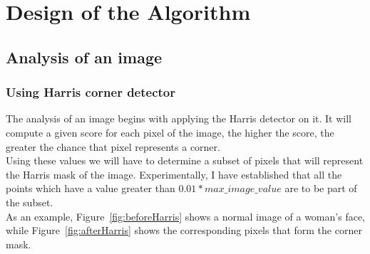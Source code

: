 \chapter{Design of the Algorithm}
\label{chap:design}

\section{Analysis of an image}

\subsection{Using Harris corner detector}
The analysis of an image begins with applying the Harris detector on it. It will compute a given score for each pixel of the image, the higher the score, the greater the chance that pixel represents a corner.\\
Using these values we will have to determine a subset of pixels that will represent the Harris mask of the image. Experimentally, I have established that all the points which have a value greater than $0.01 * max\_image\_value$ are to be part of the subset.\\
As an example, Figure~\ref{fig:beforeHarris} shows a normal image of a woman's face, while Figure~\ref{fig:afterHarris} shows the corresponding pixels that form the corner mask. \\

